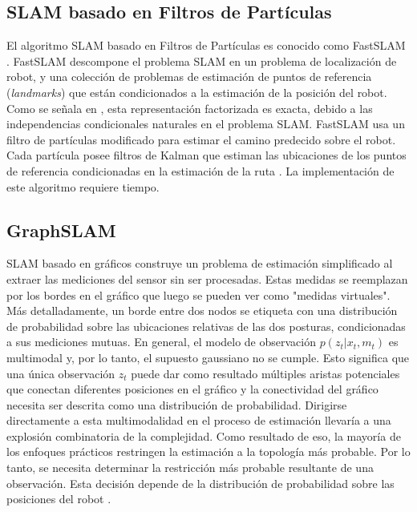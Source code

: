 \subsection{SLAM basado en Filtros de Partículas}
\label{sec:SLAM_FP}
El algoritmo SLAM basado en Filtros de Partículas es conocido como 
FastSLAM \cite{hahnel2003efficient}. FastSLAM descompone el problema SLAM en un problema de 
localizaci\'on de robot, y una colecci\'on de problemas de estimaci\'on de puntos de referencia 
(\textit{landmarks}) que est\'an condicionados a la estimaci\'on de la posici\'on del robot. Como 
se se\~nala en \cite{murphy2000bayesian}, esta representaci\'on factorizada es exacta, debido a 
las independencias condicionales naturales en el problema SLAM. FastSLAM usa un filtro de 
part\'iculas modificado para estimar el camino predecido sobre el robot. Cada part\'icula 
posee filtros de Kalman que estiman las ubicaciones de los puntos de referencia condicionadas 
en la estimaci\'on de la ruta \cite{montemerlo2007fastslam}. La implementaci\'on de este 
algoritmo requiere tiempo.

\subsection{GraphSLAM}
SLAM basado en gr\'aficos construye un problema de estimaci\'on simplificado al extraer 
las mediciones del sensor sin ser procesadas. Estas medidas se reemplazan por los bordes en 
el gr\'afico que luego se pueden ver como "medidas virtuales". M\'as detalladamente, un borde 
entre dos nodos se etiqueta con una distribuci\'on de probabilidad sobre las ubicaciones 
relativas de las dos posturas, condicionadas a sus mediciones mutuas. En general, el modelo 
de observaci\'on $p(z_{t}| x_{t}, m_{t})$ es multimodal y, por lo tanto, el supuesto gaussiano 
no se cumple. Esto significa que una \'unica observaci\'on $z_{t}$ puede dar como resultado 
m\'ultiples aristas potenciales que conectan diferentes posiciones en el gr\'afico y la 
conectividad del gr\'afico necesita ser descrita como una distribuci\'on de probabilidad. Dirigirse 
directamente a esta multimodalidad en el proceso de estimaci\'on llevar\'ia a una explosi\'on 
combinatoria de la complejidad. Como resultado de eso, la mayor\'ia de los enfoques pr\'acticos 
restringen la estimaci\'on a la topolog\'ia m\'as probable. Por lo tanto, se necesita 
determinar la restricci\'on m\'as probable resultante de una observaci\'on. Esta decisi\'on 
depende de la distribuci\'on de probabilidad sobre las posiciones del robot \cite{grisetti2010tutorial}.

